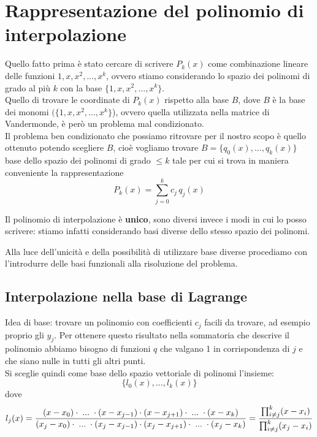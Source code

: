 \documentclass[12pt,a4paper,]{report}
\newcommand{\s}{\hspace{1mm}}
\begin{document}
\section{Rappresentazione del polinomio di interpolazione}
Quello fatto prima è stato cercare di scrivere $P_k(x)$ come combinazione lineare delle funzioni $1,x,x^2,...,x^k$, ovvero stiamo considerando lo spazio dei polinomi di grado al più $k$ con la base $\{1,x,x^2,...,x^k\}$.\\
Quello di trovare le coordinate di $P_k(x)$ rispetto alla base $B$, dove $B$ è la base dei monomi $(\{1,x,x^2,...,x^k\}$), ovvero quella utilizzata nella matrice di Vandermonde, è però un problema mal condizionato.\\
Il problema ben condizionato che possiamo ritrovare per il nostro scopo è quello ottenuto potendo scegliere $B$, cioè vogliamo trovare $B= \{q_0(x), \dots, q_k(x)\}$ base dello spazio dei polinomi di grado $\le k$ tale per cui si trova in maniera conveniente la rappresentazione
\[
P_k(x) = \sum^k_{j=0} c_j\, q_j(x)
\]
\begin{nota}
    Il polinomio di interpolazione è \textbf{unico}, sono diversi invece i modi in cui lo posso scrivere: stiamo infatti considerando basi diverse dello stesso spazio dei polinomi.
\end{nota}
\noindent
Alla luce dell'unicità e della possibilità di utilizzare base diverse procediamo con l'introdurre delle basi funzionali alla risoluzione del problema.
\subsection{Interpolazione nella base di Lagrange}
Idea di base: trovare un polinomio con coefficienti $c_j$ facili da trovare, ad esempio proprio gli $y_j$.
Per ottenere questo risultato nella sommatoria che descrive il polinomio abbiamo bisogno di funzioni $q$ che valgano 1 in corrispondenza di $j$ e che siano nulle in tutti gli altri punti.\\
Si sceglie quindi come base dello spazio vettoriale di polinomi l'insieme:
\[
\{l_0(x),...,l_k(x)\}
\]
dove 
\[
l_j(x) = 
\frac{(x-x_0)\cdot \s ... \s \cdot (x-x_{j-1})\cdot (x-x_{j+1})\cdot \s ... \s \cdot(x-x_k)}{(x_j-x_0)\cdot \s ... \s \cdot (x_j-x_{j-1})\cdot (x_j-x_{j+1})\cdot \s ... \s \cdot(x_j-x_k)} = \frac{\prod^k_{i\neq j} (x-x_i)}{\prod^k_{i\neq j} (x_j-x_i)}
\]
\end{document}
